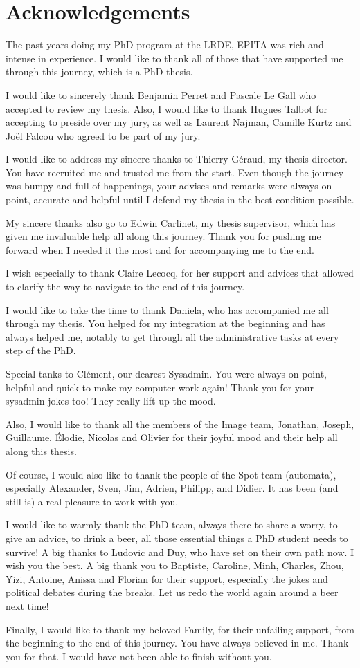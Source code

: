 \section*{Acknowledgements}
\label{sec:acknowledgement}

The past years doing my PhD program at the LRDE, EPITA was rich and intense in experience. I would like to thank all of
those that have supported me through this journey, which is a PhD thesis.

I would like to sincerely thank Benjamin Perret and Pascale Le Gall who accepted to review my thesis. Also, I would like
to thank Hugues Talbot for accepting to preside over my jury, as well as Laurent Najman, Camille Kurtz and Jo\"{e}l
Falcou who agreed to be part of my jury.

I would like to address my sincere thanks to Thierry G\'{e}raud, my thesis director. You have recruited me and trusted
me from the start. Even though the journey was bumpy and full of happenings, your advises and remarks were always on
point, accurate and helpful until I defend my thesis in the best condition possible.

My sincere thanks also go to Edwin Carlinet, my thesis supervisor, which has given me invaluable help all along this
journey. Thank you for pushing me forward when I needed it the most and for accompanying me to the end.

I wish especially to thank Claire Lecocq, for her support and advices that allowed to clarify the way to navigate to the
end of this journey.

I would like to take the time to thank Daniela, who has accompanied me all through my thesis. You helped for my
integration at the beginning and has always helped me, notably to get through all the administrative tasks at every step
of the PhD.

Special tanks to Cl\'{e}ment, our dearest Sysadmin. You were always on point, helpful and quick to make my computer work
again! Thank you for your sysadmin jokes too! They really lift up the mood.

Also, I would like to thank all the members of the Image team, Jonathan, Joseph, Guillaume, \'{E}lodie, Nicolas and
Olivier for their joyful mood and their help all along this thesis.

Of course, I would also like to thank the people of the Spot team (automata), especially Alexander, Sven, Jim, Adrien,
Philipp, and Didier. It has been (and still is) a real pleasure to work with you.

I would like to warmly thank the PhD team, always there to share a worry, to give an advice, to drink a beer, all those
essential things a PhD student needs to survive! A big thanks to Ludovic and Duy, who have set on their own path now. I
wish you the best. A big thank you to Baptiste, Caroline, Minh, Charles, Zhou, Yizi, Antoine, Anissa and Florian for
their support, especially the jokes and political debates during the breaks. Let us redo the world again around a beer
next time!

Finally, I would like to thank my beloved Family, for their unfailing support, from the beginning to the end of this
journey. You have always believed in me. Thank you for that. I would have not been able to finish without you.
